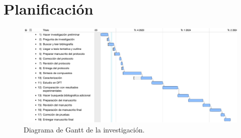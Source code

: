 \section{Planificación}
\begin{figure}[H]
	\includegraphics[width=\linewidth]{./Figuras/gantt.pdf}
	\caption{Diagrama de Gantt de la investigación.}
	\label{fig:gantt}
\end{figure}

